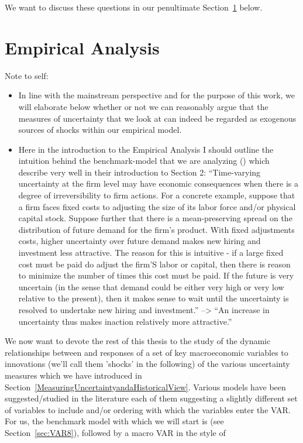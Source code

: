 \documentclass[a4paper,12pt,oneside,pointednumbers,bibtotoc,bigheadings,liststotoc]{scrbook}
\begin{document}
We want to discuss these questions in our penultimate Section~\ref{sec:EmpiricalAnalysis} below.

\chapter{Empirical Analysis}
\label{sec:EmpiricalAnalysis}
\begingroup
    \fontsize{8pt}{12pt}\selectfont
    Note to self:
\begin{itemize}
	\item  In line with the mainstream perspective and for the purpose of this work, we will elaborate below whether or not we can reasonably argue that the measures of uncertainty that we look at can indeed be regarded as exogenous sources of shocks within our empirical model. 
	\item Here in the introduction to the Empirical Analysis I should outline the intuition behind the benchmark-model that we are analyzing (\citet{bloom:09}) which \citet{bachmannetal:13} describe very well in their introduction to Section 2: ``Time-varying uncertainty at the firm level may have economic consequences when there is a degree of irreversibility to firm actions. For a concrete example, suppose that a firm faces fixed costs to adjusting the size of its labor force and/or physical capital stock. Suppose further that there is a mean-preserving spread on the distribution of future demand for the firm's product. With fixed adjustments costs, higher uncertainty over future demand makes new hiring and investment less attractive. The reason for this is intuitive - if a large fixed cost must be paid do adjust the firm'S labor or capital, then there is reason to minimize the number of times this cost must be paid. If the future is very uncertain (in the sense that demand could be either very high or very low relative to the present), then it makes sense to wait until the uncertainty is resolved to undertake new hiring and investment.'' --> ``An increase in uncertainty thus makes inaction relatively more attractive.'' 
\end{itemize}
\endgroup

We now want to devote the rest of this thesis to the study of the dynamic relationships between and responses of a set of key macroeconomic variables to innovations (we'll call them 'shocks' in the following) of the various uncertainty measures which we have introduced in Section~\ref{MeasuringUncertaintyandaHistoricalView}. Various models have been suggested/studied in the literature each of them suggesting a slightly different set of variables to include and/or ordering with which the variables enter the VAR. For us, the benchmark model with which we will start is \citet{bloom:09} (see Section~\ref{sec:VAR8}), followed by a macro VAR in the style of \citet{christianoetal:05} 
\end{document}
